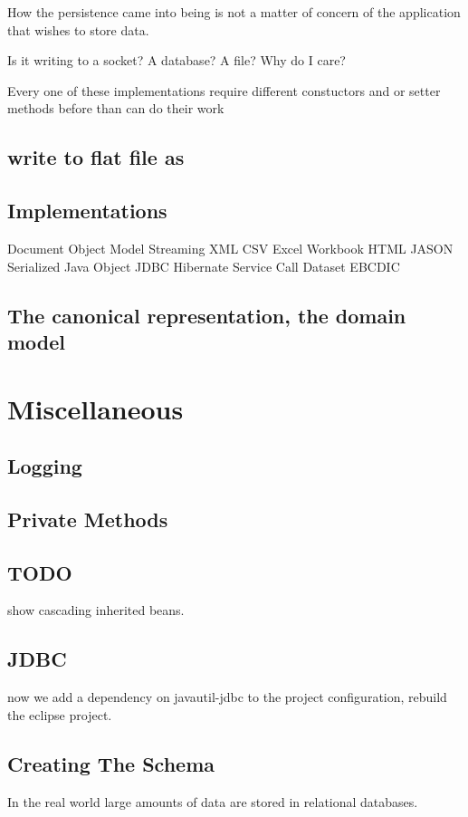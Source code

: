 \documentclass[a4paper,10pt]{book}
\begin{document}
How the persistence came into being is not a matter of concern of the application that wishes to store data.

Is it writing to a socket? A database? A file?  Why do I care?

Every one of these implementations require different constuctors 
and or setter methods before than can do their work

\section{write to flat file as }

\section{Implementations}
Document Object Model
Streaming XML
CSV
Excel Workbook
HTML
JASON
Serialized Java Object
JDBC
Hibernate
Service Call
Dataset
EBCDIC

\section{The canonical representation, the domain model}

\chapter{Miscellaneous}
\section{Logging}

\section{Private Methods}
\section{TODO}
show cascading inherited beans.

\section{JDBC}
now we add a dependency on javautil-jdbc to the project configuration, rebuild the eclipse project.

\section{Creating The Schema}
In the real world large amounts of data are stored in relational databases. 
\end{document}
